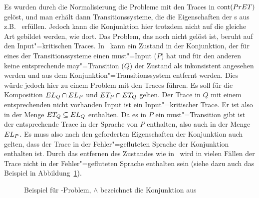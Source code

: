 Es wurden durch die Normalisierung die Probleme mit den Traces in $\mathrm{cont}
(PrET)$ gelöst, und man erhält dann Transitionssysteme, die die Eigenschaften
der \MIA{}s aus z.B.~\cite{Vogler2016MIA3} erfüllen. Jedoch kann die
Konjunktion hier trotzdem nicht auf die gleiche Art gebildet werden, wie dort.
Das Problem, das noch nicht gelöst ist, beruht auf den Input"=kritischen
Traces. In~\cite{Vogler2016MIA3} kann ein Zustand in der Konjunktion, der für
eines der Transitionssysteme einen must"=Input ($P$) hat und für den anderen
keine entsprechende may"=Transition ($Q$) der Zustand als inkonsistent
angesehen werden und aus dem Konjunktion"=Transitionssystem entfernt werden.
Dies würde jedoch hier zu einem Problem mit den Traces führen. Es soll für die
Komposition $EL _Q \cap EL _P$ und $ET _P \cap ET _Q$ gelten. Der Trace in
$Q$ mit einem entsprechenden nicht vorhanden Input ist ein Input"=kritischer
Trace. Er ist also in der Menge $ET _Q\subseteq EL _Q$ enthalten. Da es in
$P$ ein must"=Transition gibt ist der entsprechende Trace in der Sprache von
$P$ enthalten, also auch in der Menge $EL _P$. Es muss also nach den
geforderten Eigenschaften der Konjunktion auch gelten, dass der Trace in der
Fehler"=gefluteten Sprache der Konjunktion enthalten ist. Durch das entfernen
des Zustandes wie in~\cite{Vogler2016MIA3} wird in vielen Fällen der Trace
nicht in der Fehler"=gefluteten Sprache enthalten sein (siehe dazu auch das
Beispiel in Abbildung~\ref{BspMITConj}).

\begin{figure}[htbp]
  \begin{center}
    \caption{Beispiel für \MIT{}-Problem, $\land$ bezeichnet die Konjunktion
    aus~\cite{Vogler2016MIA3}}
    \label{BspMITConj}
  \end{center}
\end{figure}

